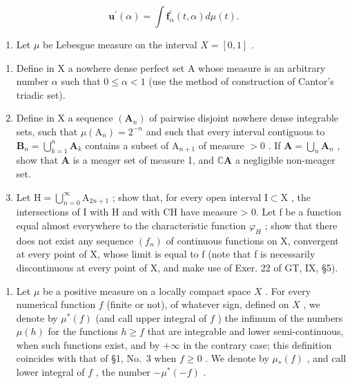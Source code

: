\[
\mathbf {u} ^ {\prime} (\alpha) = \int \mathbf {f} _ {\alpha} ^ {\prime} (t, \alpha) d \mu (t).
\]

\begin{enumerate}
\def\labelenumi{\arabic{enumi})}
\setcounter{enumi}{3}
\tightlist
\item
  Let \(\mu\) be Lebesgue measure on the interval \(X = [0,1]\) .
\end{enumerate}

\begin{enumerate}
\def\labelenumi{\alph{enumi})}
\item
  Define in X a nowhere dense perfect set A whose measure is an arbitrary number \(\alpha\) such that \(0 \leqslant \alpha < 1\) (use the method of construction of Cantor's triadic set).
\item
  Define in X a sequence \((\mathbf{A}_n)\) of pairwise disjoint nowhere dense integrable sets, such that \(\mu (\mathrm{A}_n) = 2^{-n}\) and such that every interval contiguous to \(\mathbf{B}_n = \bigcup_{k = 1}^{n}\mathbf{A}_k\) contains a subset of \(\mathrm{A}_{n + 1}\) of measure \(>0\) . If \(\mathbf{A} = \bigcup_{n}\mathbf{A}_n\) , show that \(\mathbf{A}\) is a meager set of measure 1, and \(\mathbb{C}\mathbf{A}\) a negligible non-meager set.
\item
  Let \(\mathrm{H} = \bigcup_{n=0}^{\infty} \mathrm{A}_{2n+1}\) ; show that, for every open interval \(\mathrm{I} \subset \mathrm{X}\) , the intersections of I with H and with CH have measure \textgreater{} 0. Let f be a function equal almost everywhere to the characteristic function \(\varphi_{H}\) ; show that there does not exist any sequence \((f_{n})\) of continuous functions on X, convergent at every point of X, whose limit is equal to f (note that f is necessarily discontinuous at every point of X, and make use of Exer. 22 of GT, IX, §5).
\end{enumerate}

\begin{enumerate}
\def\labelenumi{\arabic{enumi})}
\setcounter{enumi}{4}
\tightlist
\item
  Let \(\mu\) be a positive measure on a locally compact space \(X\) . For every numerical function \(f\) (finite or not), of whatever sign, defined on \(X\) , we denote by \(\mu^{*}(f)\) (and call upper integral of \(f\) ) the infimum of the numbers \(\mu(h)\) for the functions \(h \geqslant f\) that are integrable and lower semi-continuous, when such functions exist, and by \(+\infty\) in the contrary case; this definition coincides with that of §1, No.~3 when \(f \geqslant 0\) . We denote by \(\mu_{*}(f)\) , and call lower integral of \(f\) , the number \(-\mu^{*}(-f)\) .
\end{enumerate}

